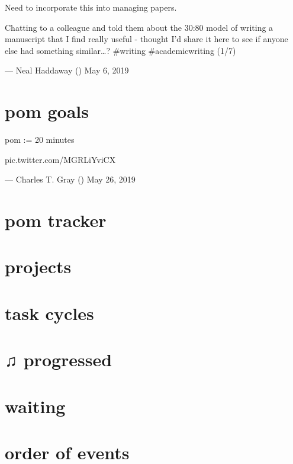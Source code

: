 \documentclass[]{book}
\begin{document}
Need to incorporate this into managing papers.

Chatting to a colleague and told them about the 30:80 model of writing a manuscript that I find really useful - thought I'd share it here to see if anyone else had something similar\ldots{}? \#writing \#academicwriting (1/7)

--- Neal Haddaway (\citet{nealhaddaway}) May 6, 2019

\hypertarget{dayview:goals}{%
\section{pom goals}\label{dayview:goals}}

pom := 20 minutes

pic.twitter.com/MGRLiYviCX

--- Charles T. Gray (\citet{cantabile}) May 26, 2019

\hypertarget{dayview:pom-tracker}{%
\section{pom tracker}\label{dayview:pom-tracker}}

\hypertarget{dayview:projects}{%
\section{projects}\label{dayview:projects}}

\hypertarget{dayview:task-cycles}{%
\section{task cycles}\label{dayview:task-cycles}}

\hypertarget{dayview:progressed}{%
\section{♫ progressed}\label{dayview:progressed}}

\hypertarget{dayview:waiting}{%
\section{waiting}\label{dayview:waiting}}

\hypertarget{dayview:order-of-events}{%
\section{order of events}\label{dayview:order-of-events}}
\end{document}
